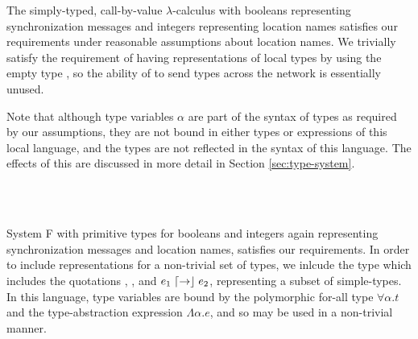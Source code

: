 \begin{ex}
  \label{ex:st-lambda}
  The simply-typed, call-by-value $\lambda$-calculus with booleans representing synchronization messages and integers representing location names satisfies our requirements under reasonable assumptions about location names.
  We trivially satisfy the requirement of having representations of local types by using the empty type \Empty, so the ability of \langname to send types across the network is essentially unused.

  Note that although type variables $\alpha$ are part of the syntax of types as required by our assumptions, they are not bound in either types or expressions of this local language, and the types are not reflected in the syntax of this language.
  The effects of this are discussed in more detail in Section \ref{sec:type-system}.
  \begin{syntax}
  	 \alternative{\alpha} \alternative{\Int} \alternative{\Bool} \alternative{\Empty} 
       \\
      \\
    \alternative{\True} \alternative{\False} 
  \end{syntax}
\end{ex}

\begin{ex}[System F]
  \label{ex:system-f}
  System F with primitive types for booleans and integers again representing synchronization messages and location names, satisfies our requirements.
  In order to include representations for a non-trivial set of types, we inlcude the type \Typ which includes the quotations \say{\Int}, \say{\Bool}, and $e_1 \mathrel{\lceil\mathord{\to}\rfloor} e_2$, representing a subset of simple-types.
  In this language, type variables are bound by the polymorphic for-all type $\forall \alpha.t$ and the type-abstraction expression $\Lambda \alpha.e$, and so may be used in a non-trivial manner.
  \begin{syntax}
  	 \alternative{\alpha} \alternative{\Int} \alternative{\Bool} \alternative{\Typ}\\
  	 
         \\
      \\
    \alternative{\True} \alternative{\False} \\
    \alternative{\say{\Int}} \alternative{\say{\Bool}} 
  \end{syntax}
\end{ex}

